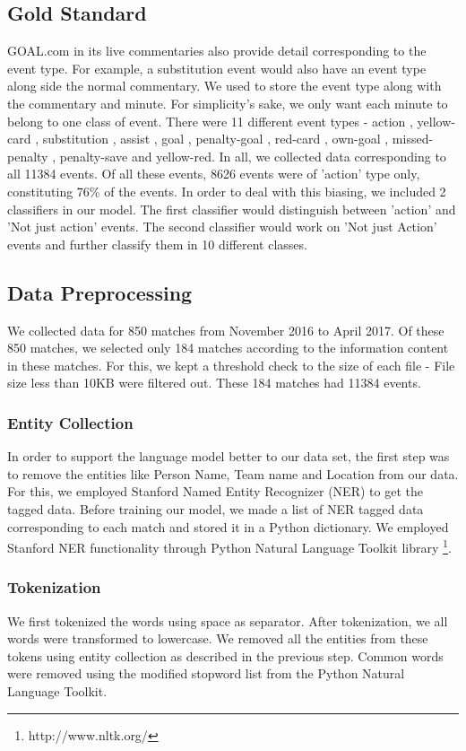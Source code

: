 \documentclass[11pt,letterpaper]{article}
\begin{document}
\subsection{Gold Standard} \label{Gold Standard}
GOAL.com in its live commentaries also provide detail corresponding to the event type. For example, a substitution event would also have an event type along side the normal commentary. We used to store the event type along with the commentary and minute. For simplicity's sake, we only want each minute to belong to one class of event. There were 11 different event types - action , yellow-card , substitution , assist , goal , penalty-goal , red-card , own-goal , missed-penalty , penalty-save  and  yellow-red. In all, we collected data corresponding to all 11384 events. Of all these events, 8626 events were
of 'action' type only, constituting 76\% of the events. In order to deal with this biasing, we included 2 classifiers in our model. The first classifier would distinguish between 'action' and 'Not just action' events. The second classifier would work on 'Not just Action' events and further classify them in 10 different classes.

\subsection{Data Preprocessing}
We collected data for 850 matches from November 2016 to April 2017. Of these 850 matches, we selected only 184 matches according to the information content in these matches. For this, we kept a threshold check to the size of each file - File size less than 10KB were filtered out. These 184 matches had 11384 events.

\subsubsection{Entity Collection} 
In order to support the language model better to our data set, the first step was to remove the entities like Person Name, Team name and Location from our data. For this, we employed Stanford Named Entity Recognizer (NER) to get the tagged data. Before training our model, we made a list of NER tagged data corresponding to each match and stored it in a Python dictionary. We employed Stanford NER functionality through Python Natural Language Toolkit library \footnote{http://www.nltk.org/}.

\subsubsection{Tokenization}
We first tokenized the words using space as separator. After tokenization, we all words were transformed to lowercase. We removed all the entities from these tokens using entity collection as described in the previous step. Common words were removed using the modified stopword list from the Python Natural Language Toolkit.
\end{document}
